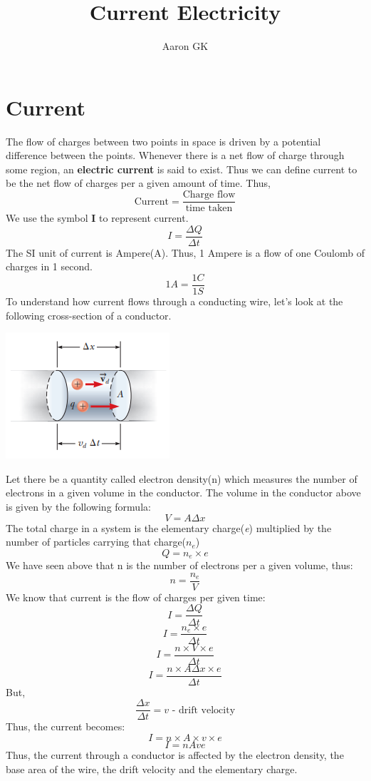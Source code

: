 \documentclass[9pt,addpoints]{exam}
\author{Aaron GK}
\begin{document}
\title{Current Electricity}
\maketitle
\section*{Current}
The flow of charges between two points in space is driven by a 
potential difference between the points. Whenever there is a net flow of charge through some region, an \textbf{electric current} is said to exist. Thus we can define current to be the net flow of charges per a given amount of time. Thus, 
$$\text{Current} = \frac{\text{Charge flow}}{\text{time taken}}$$
We use the symbol \textbf{I} to represent current. 
$$I = \frac{\varDelta Q}{\varDelta t}$$
The SI unit of current is Ampere(A). Thus, 1 Ampere is a flow of one Coulomb of charges in 1 second.
$$1 A= \frac{1 C}{1 S}$$
To understand how current flows through a conducting wire, let's look at the following cross-section of a conductor. \\
\begin{center}
	\includegraphics[scale=1]{conductor.png}
\end{center}	 
Let there be a quantity called electron density(n) which measures the number of electrons in a given volume in the conductor. The volume in the conductor above is given by the following formula:
$$V = A \varDelta x$$
The total charge in a system is the elementary charge(\textit{e}) multiplied by the number of particles carrying that charge($n_e$)
$$Q = n_e \times \textit{e}$$
We have seen above that n is the number of electrons per a given volume, thus:
$$n = \frac{n_e}{V}$$
We know that current is the flow of charges per given time:
$$I = \frac{\varDelta Q}{\varDelta t}$$
$$I = \frac{n_e \times e}{\varDelta t}$$
$$I = \frac{n \times V \times e}{\varDelta t}$$
$$I = \frac{n \times A\varDelta x \times e}{\varDelta t}$$
But, $$\frac{\varDelta x}{\varDelta t} = v \text{   - drift velocity}$$
Thus, the current becomes:
$$I = n \times A \times v\times e$$
$$I = nAve$$
Thus, the current through a conductor is affected by the electron density, the base area of the wire, the drift velocity and the elementary charge.
\end{document}

